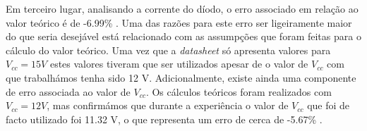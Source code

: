 Em terceiro lugar, analisando a corrente do díodo, o erro associado em relação ao valor teórico é de -6.99\% . Uma das razões para este erro ser ligeiramente maior do que seria desejável está relacionado com as assumpções que foram feitas para o cálculo do valor teórico. Uma vez que a \textit{datasheet} só apresenta valores para $V_{cc}= 15 V$ estes valores tiveram que ser utilizados apesar de  o valor de $V_{cc}$ com que trabalhámos tenha sido 12 V. Adicionalmente, existe ainda uma componente de erro associada ao valor de $V_{cc}$. Os cálculos teóricos foram realizados com $V_{cc}= 12V$, mas confirmámos que durante a experiência o valor de $V_{cc}$ que foi de facto utilizado foi 11.32 V, o que representa um erro de cerca de -5.67\% . 

